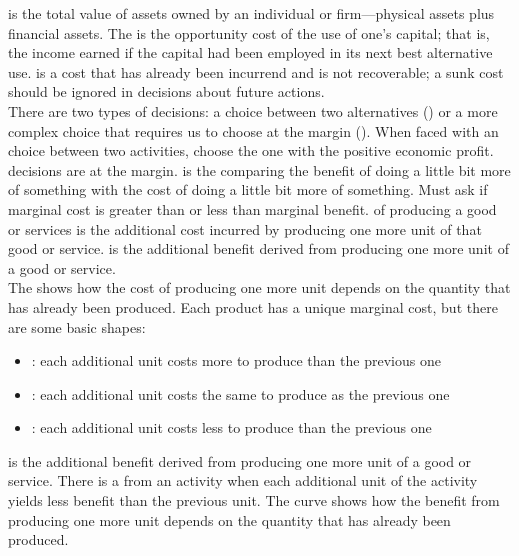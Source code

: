 \documentclass{article}
\begin{document}
 is the total value of assets owned by an individual or firm---physical assets plus financial assets. The  is the opportunity cost of the use of one's capital; that is, the income earned if the capital had been employed in its next best alternative use.  is a cost that has already been incurrend and is not recoverable; a sunk cost should be ignored in decisions about future actions. \\ 

There are two types of decisions: a choice between two alternatives () or a more complex choice that requires us to choose at the margin (). When faced with an  choice between two activities, choose the one with the positive economic profit.  decisions are at the margin.  is the comparing the benefit of doing a little bit more of something with the cost of doing a little bit more of something. Must ask if marginal cost is greater than or less than marginal benefit.  of producing a good or services is the additional cost incurred by producing one more unit of that good or service.  is the additional benefit derived from producing one more unit of a good or service. \\ 

The  shows how the cost of producing one more unit depends on the quantity that has already been produced. Each product has a unique marginal cost, but there are some basic shapes:
\begin{itemize}
  \item {}: each additional unit costs more to produce than the previous one
  \item {}: each additional unit costs the same to produce as the previous one 
  \item {}: each additional unit costs less to produce than the previous one
\end{itemize}
 is the additional benefit derived from producing one more unit of a good or service. There is a  from an activity when each additional unit of the activity yields less benefit than the previous unit. The  curve shows how the benefit from producing one more unit depends on the quantity that has already been produced. \\ 
\end{document}

